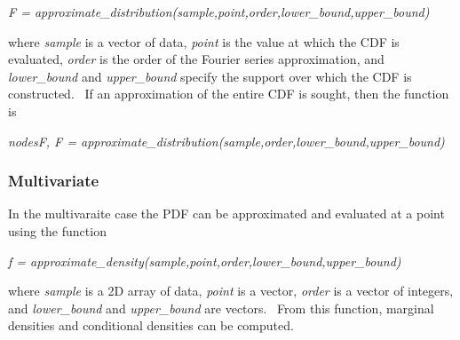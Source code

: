 \documentclass[notitlepage,11pt]{article}
\begin{document}
\textit{F =
approximate\_distribution(sample,point,order,lower\_bound,upper\_bound)}

\bigskip

where \textit{sample} is a vector of data, \textit{point} is the value at
which the CDF is evaluated, \textit{order} is the order of the Fourier
series approximation, and \textit{lower\_bound} and \textit{upper\_bound}
specify the support over which the CDF is constructed. \ If an approximation
of the entire CDF is sought, then the function is

\bigskip 

\textit{nodesF, F =
approximate\_distribution(sample,order,lower\_bound,upper\_bound)}

\bigskip 

\subsubsection{Multivariate}

In the multivaraite case the PDF can be approximated and evaluated at a
point using the function

\bigskip 

\textit{f =
approximate\_density(sample,point,order,lower\_bound,upper\_bound)}

\bigskip 

where \textit{sample} is a 2D array of data, \textit{point} is a vector, 
\textit{order} is a vector of integers, and \textit{lower\_bound} and 
\textit{upper\_bound} are vectors. \ From this function, marginal densities
and conditional densities can be computed.
\end{document}
